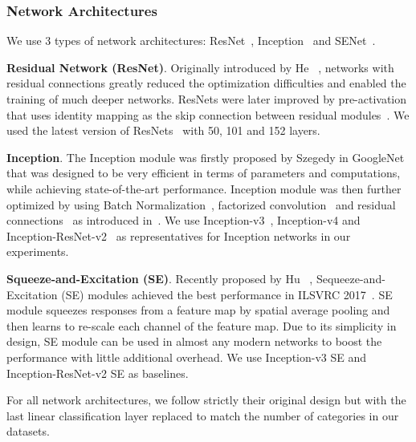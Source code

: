 \documentclass[10pt,twocolumn,letterpaper]{article}
\begin{document}
\subsubsection{Network Architectures}
\label{sec:exp_network}

We use 3 types of network architectures: ResNet~\cite{resnet, resnet-v2}, Inception~\cite{googlenet, inception-v3, inception-v4} and SENet~\cite{senet}.

\textbf{Residual Network (ResNet)}.
Originally introduced by He \etal~\cite{resnet}, networks with residual connections greatly reduced the optimization difficulties and enabled the training of much deeper networks.
ResNets were later improved by pre-activation that uses identity mapping as the skip connection between residual modules~\cite{resnet-v2}.
We used the latest version of ResNets~\cite{resnet-v2} with 50, 101 and 152 layers.

\textbf{Inception}.
The Inception module was firstly proposed by Szegedy \etal in GoogleNet~\cite{googlenet} that was designed to be very efficient in terms of parameters and computations, while achieving state-of-the-art performance.
Inception module was then further optimized by using Batch Normalization~\cite{bn}, factorized convolution~\cite{inception-v3, inception-v4} and residual connections~\cite{inception-v4} as introduced in~\cite{resnet}.
We use Inception-v3~\cite{inception-v3}, Inception-v4 and Inception-ResNet-v2~\cite{inception-v4} as representatives for Inception networks in our experiments.

\textbf{Squeeze-and-Excitation (SE)}.
Recently proposed by Hu \etal~\cite{senet}, Sequeeze-and-Excitation (SE) modules achieved the best performance in ILSVRC 2017~\cite{ilsvrc}.
SE module squeezes responses from a feature map by spatial average pooling and then learns to re-scale each channel of the feature map.
Due to its simplicity in design, SE module can be used in almost any modern networks to boost the performance with little additional overhead.
We use Inception-v3 SE and Inception-ResNet-v2 SE as baselines.

For all network architectures, we follow strictly their original design but with the last linear classification layer replaced to match the number of categories in our datasets.
\end{document}
